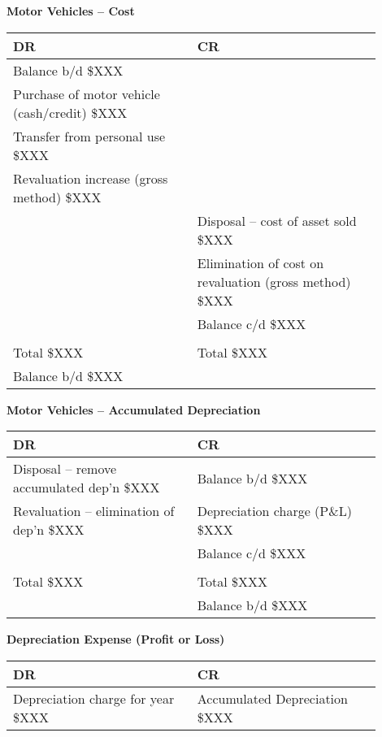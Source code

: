 \newpage
{}

\textbf{Motor Vehicles – Cost}\\[3pt]
\begin{tabular}{@{}p{0.45\linewidth} p{0.45\linewidth}@{}}
\textbf{DR} & \textbf{CR} \\ \midrule
Balance b/d \hfill \$XXX & \\
Purchase of motor vehicle (cash/credit) \hfill \$XXX & \\
Transfer from personal use \hfill \$XXX & \\
Revaluation increase (gross method) \hfill \$XXX & \\
& Disposal – cost of asset sold \hfill \$XXX \\
& Elimination of cost on revaluation (gross method) \hfill \$XXX \\
& Balance c/d \hfill \$XXX \\[3pt]
\multicolumn{2}{c}{\hrulefill} \\
Total \hfill \$XXX & Total \hfill \$XXX \\[6pt]
Balance b/d \hfill \$XXX & \\
\end{tabular}

\vspace{1cm}

\textbf{Motor Vehicles – Accumulated Depreciation}\\[3pt]
\begin{tabular}{@{}p{0.45\linewidth} p{0.45\linewidth}@{}}
\textbf{DR} & \textbf{CR} \\ \midrule
Disposal – remove accumulated dep’n \hfill \$XXX & Balance b/d \hfill \$XXX \\
Revaluation – elimination of dep’n \hfill \$XXX & Depreciation charge (P\&L) \hfill \$XXX \\
& Balance c/d \hfill \$XXX \\[3pt]
\multicolumn{2}{c}{\hrulefill} \\
Total \hfill \$XXX & Total \hfill \$XXX \\[6pt]
& Balance b/d \hfill \$XXX \\
\end{tabular}

\vspace{1cm}

\textbf{Depreciation Expense (Profit or Loss)}\\[3pt]
\begin{tabular}{@{}p{0.45\linewidth} p{0.45\linewidth}@{}}
\textbf{DR} & \textbf{CR} \\ \midrule
Depreciation charge for year \hfill \$XXX & Accumulated Depreciation \hfill \$XXX \\
\end{tabular}

